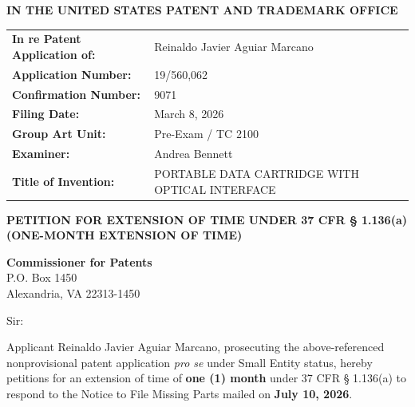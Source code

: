 \documentclass[11pt,letterpaper]{article}
\begin{document}
\thispagestyle{empty}

\begin{center}
    \large\textbf{IN THE UNITED STATES PATENT AND TRADEMARK OFFICE} \\
\end{center}

\vspace{0.3cm}
\noindent\begin{tabular}{p{2.3in}p{4.0in}}
\textbf{In re Patent Application of:} & Reinaldo Javier Aguiar Marcano \\
\textbf{Application Number:} & 19/560,062 \\
\textbf{Confirmation Number:} & 9071 \\
\textbf{Filing Date:} & March 8, 2026 \\
\textbf{Group Art Unit:} & Pre-Exam / TC 2100 \\
\textbf{Examiner:} & Andrea Bennett \\
\textbf{Title of Invention:} & PORTABLE DATA CARTRIDGE WITH OPTICAL INTERFACE \\
\end{tabular}

\vspace{0.8cm}
\begin{center}
    \textbf{\large PETITION FOR EXTENSION OF TIME UNDER 37 CFR \S{} 1.136(a) \\
    (ONE-MONTH EXTENSION OF TIME)}
\end{center}

\vspace{0.4cm}
\noindent\textbf{Commissioner for Patents} \\
\noindent P.O. Box 1450 \\
\noindent Alexandria, VA 22313-1450

\vspace{0.4cm}
\noindent Sir:

Applicant Reinaldo Javier Aguiar Marcano, prosecuting the above-referenced nonprovisional patent application \textit{pro se} under Small Entity status, hereby petitions for an extension of time of \textbf{one (1) month} under 37 CFR \S{} 1.136(a) to respond to the Notice to File Missing Parts mailed on \textbf{July 10, 2026}.
\end{document}
